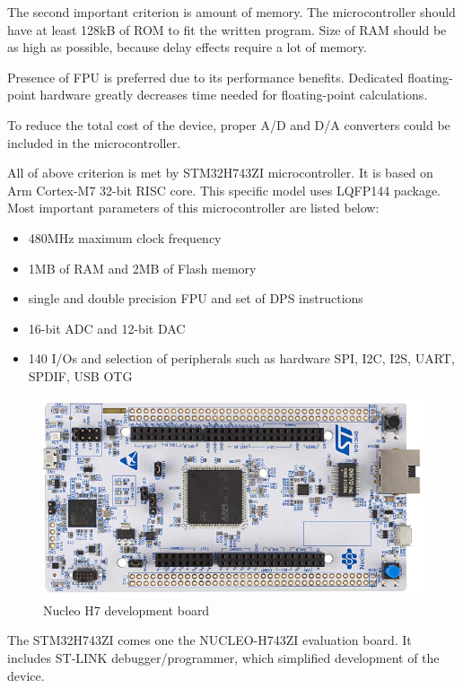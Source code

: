 \documentclass[a4paper,twoside,12pt]{book}
\begin{document}
The second important criterion is amount of memory.
The microcontroller should have at least 128kB of ROM
to fit the written program.
Size of RAM should be as high as possible,
because delay effects require a lot of memory.

Presence of FPU is preferred due to its performance benefits.
Dedicated floating-point hardware greatly decreases time
needed for floating-point calculations.

To reduce the total cost of the device,
proper A/D and D/A converters could be included in the microcontroller.

All of above criterion is met by STM32H743ZI microcontroller.
\cite{ST:RM}
It is based on Arm Cortex-M7 32-bit RISC core.
This specific model uses LQFP144 package.
Most important parameters of this microcontroller are listed below:
\begin{itemize}
    \item 480MHz maximum clock frequency
    \item 1MB of RAM and 2MB of Flash memory
    \item single and double precision FPU and set of DPS instructions
    \item 16-bit ADC and 12-bit DAC
    \item 140 I/Os and selection of peripherals such as hardware
    SPI, I2C, I2S, UART, SPDIF, USB OTG
\end{itemize}

\begin{figure}[H]
    \centering
    \includegraphics[width=\textwidth]{images/Nucleo}
    \caption{Nucleo H7 development board}
    \label{fig:Nucleo}
\end{figure}

The STM32H743ZI comes one the NUCLEO-H743ZI evaluation board.
It includes ST-LINK debugger/programmer,
which simplified development of the device. 
\cite{ST:UM2407}
\end{document}
